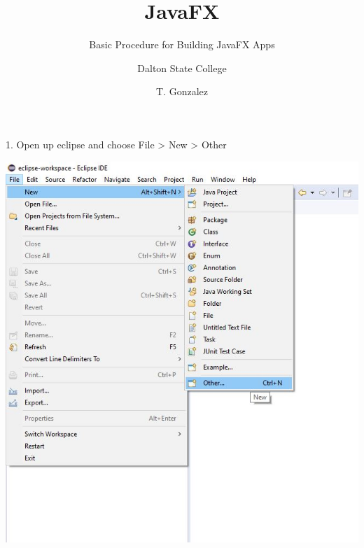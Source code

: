 \documentclass{beamer}
\title[]{JavaFX}
\subtitle{Basic Procedure for Building JavaFX Apps} %
\author[]{Dalton State College}
\date[T. Gonzalez]{T. Gonzalez}
\begin{document}
\begin{frame}

	\titlepage
	
\end{frame}

\begin{frame}
    
        1.  Open up eclipse and choose File > New > Other
        
        \begin{center}
            \includegraphics[scale=.4]{file_new_other.jpg}
        \end{center}
        
\end{frame}
\end{document}
